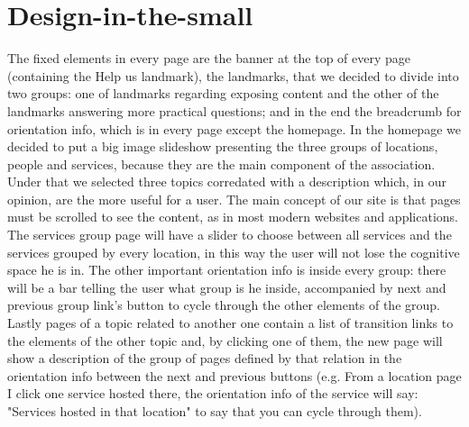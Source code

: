 %
%
\chapter{Design-in-the-small}
%
The fixed elements in every page are the banner at the top of every page (containing the Help us landmark), the landmarks, that we decided to divide into two groups: one of landmarks regarding exposing content and the other of the landmarks answering more practical questions; and in the end the breadcrumb for orientation info, which is in every page except the homepage. In the homepage we decided to put a big image slideshow presenting the three groups of locations, people and services, because they are the main component of the association. Under that we selected three topics corredated with a description which, in our opinion, are the more useful for a user. The main concept of our site is that pages must be scrolled to see the content, as in most modern websites and applications. The services group page will have a slider to choose between all services and the services grouped by every location, in this way the user will not lose the cognitive space he is in. The other important orientation info is inside every group: there will be a bar telling the user what group is he inside, accompanied by next and previous group link's button to cycle through the other elements of the group. Lastly pages of a topic related to another one contain a list of transition links to the elements of the other topic and, by clicking one of them, the new page will show a description of the group of pages defined by that relation in the orientation info between the next and previous buttons (e.g. From a location page I click one service hosted there, the orientation info of the service will say: "Services hosted in that location" to say that you can cycle through them).
%
